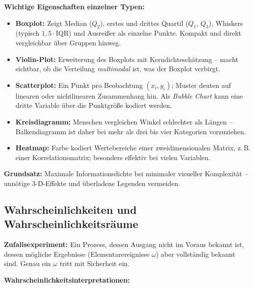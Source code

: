 \noindent\textbf{Wichtige Eigenschaften einzelner Typen:}

\begin{itemize}[leftmargin=1.5em]
    \item \textbf{Boxplot:} Zeigt Median ($Q_2$), erstes und drittes Quartil ($Q_1$, $Q_3$),
    Whiskers (typisch $1{,}5 \cdot \text{IQR}$) und Ausreißer als einzelne Punkte.
    Kompakt und direkt vergleichbar über Gruppen hinweg.

    \item \textbf{Violin-Plot:} Erweiterung des Boxplots mit Kerndichteschätzung --
    macht sichtbar, ob die Verteilung \emph{multimodal} ist, was der Boxplot verbirgt.

    \item \textbf{Scatterplot:} Ein Punkt pro Beobachtung $(x_i, y_i)$; Muster deuten auf
    linearen oder nichtlinearen Zusammenhang hin. Als \emph{Bubble Chart} kann eine dritte Variable
    über die Punktgröße kodiert werden.

    \item \textbf{Kreisdiagramm:} Menschen vergleichen Winkel schlechter als Längen --
    Balkendiagramm ist daher bei mehr als drei bis vier Kategorien vorzuziehen.

    \item \textbf{Heatmap:} Farbe kodiert Wertebereiche einer zweidimensionalen Matrix,
    z.\,B. einer Korrelationsmatrix; besonders effektiv bei vielen Variablen.
\end{itemize}

\noindent\textbf{Grundsatz:} Maximale Informationsdichte bei minimaler visueller Komplexität --
unnötige 3-D-Effekte und überladene Legenden vermeiden.

\newpage

\subsection{Wahrscheinlichkeiten und Wahrscheinlichkeitsräume}

\textbf{Zufallsexperiment:} Ein Prozess, dessen Ausgang nicht im Voraus bekannt ist, dessen mögliche Ergebnisse (Elementarereignisse $\omega$) aber vollständig bekannt sind. Genau ein $\omega$ tritt mit Sicherheit ein.

\medskip
\noindent\textbf{Wahrscheinlichkeitsinterpretationen:}

